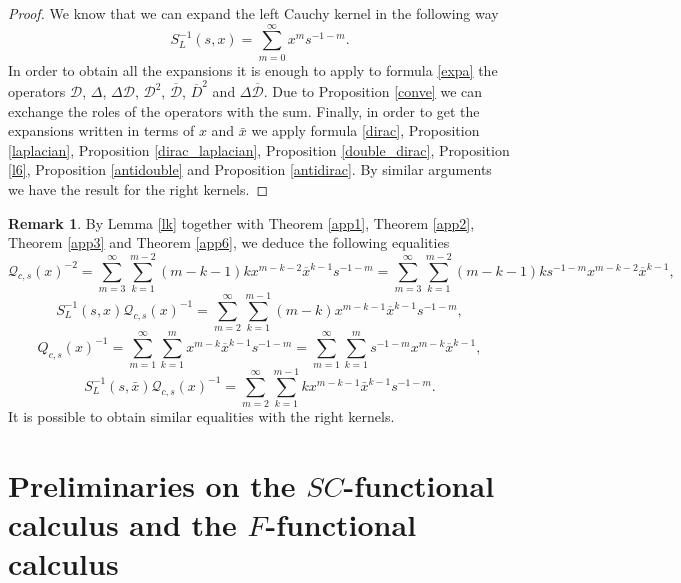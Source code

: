 \documentclass[reqno,11pt]{amsart}
\numberwithin{equation}{section}
\newcommand{\qcs}{\mathcal Q_{c,s}(x)}
\theoremstyle{definition}
\newtheorem{remark}[theorem]{{\bf Remark}}
\begin{document}
\begin{proof}
We know that we can expand the left Cauchy kernel in the following way
\begin{equation}
\label{expa}
S^{-1}_L(s,x)=\sum_{m=0}^\infty x^ms^{-1-m}.
\end{equation}
In order to obtain all the expansions it is enough to apply to formula \eqref{expa} the operators $\mathcal{D}$, $\Delta$, $\Delta \mathcal{D}$, $\mathcal{D}^2$, $\mathcal{\overline{D}}$, $ \overline{D}^2$ and $ \Delta \mathcal{\overline{D}}$. Due to Proposition \ref{conve} we can exchange the roles of the operators with the sum. Finally, in order to get the expansions written in terms of $x$ and $ \bar{x}$ we apply formula \eqref{dirac}, Proposition \ref{laplacian}, Proposition \ref{dirac_laplacian}, Proposition \ref{double_dirac}, Proposition \ref{l6}, Proposition \ref{antidouble} and Proposition \ref{antidirac}. By similar arguments we have the result for the right kernels.
\end{proof}



\begin{remark}
By Lemma \ref{lk} together with Theorem \ref{app1}, Theorem \ref{app2}, Theorem \ref{app3} and Theorem \ref{app6}, we deduce the following equalities
$$\mathcal Q_{c,s}(x)^{-2}=\sum_{m=3}^{\infty}\sum_{k=1}^{m-2}(m-k-1)k x^{m-k-2}\overline x^{k-1}s^{-1-m}=\sum_{m=3}^{\infty}\sum_{k=1}^{m-2}(m-k-1)k s^{-1-m}x^{m-k-2}\overline x^{k-1},$$
$$ S^{-1}_L(s,x) \mathcal{Q}_{c,s}(x)^{-1}=\sum_{m=2}^\infty\sum_{k=1}^{m-1} (m-k)x^{m-k-1}\overline x^{k-1}s^{-1-m},$$
$$Q_{c,s}(x)^{-1}=\sum_{m=1}^\infty \sum_{k=1}^m x^{m-k}\overline x^{k-1}s^{-1-m}=\sum_{m=1}^\infty \sum_{k=1}^m s^{-1-m} x^{m-k}\overline x^{k-1},$$
$$ S^{-1}_L (s, \bar{x})\qcs^{-1}=\sum_{m=2}^\infty \sum_{k=1}^{m-1} k x^{m-k-1} \bar{x}^{k-1}s^{-1-m}.$$
It is possible to obtain similar equalities with the right kernels.
\end{remark}



\section{Preliminaries on the $SC$-functional calculus and the $F$-functional calculus}\label{prelSCFFC}
\end{document}
